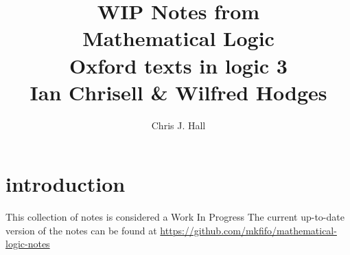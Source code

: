 \documentclass[a4paper, titlepage]{report}
\makeatletter
\renewcommand\subsection{\@startsection{subsection}{2}{\z@}
                                     {-3.25ex\@plus -1ex \@minus -.2ex}%
                                     {-1em}%
                                     {\normalfont\large\bfseries}}
\makeatother
\begin{document}
\newcommand{\RULE}[4]{
  {
  \iffalse
    TODO FIXME automate adding to rules sections
  \fi
  \bigskip
  \subsection{
    \texorpdfstring{
      \uppercase{#1 rule (#2 rule)}
    }{
      #1 rule (#2 rule)
    }
  }
  \hfill page #3 \\
  \indent
  #4
  }
}

\newcommand{\EXERCISE}[4]{
  {
  \iffalse
    TODO FIXME automate adding to exercises list?
  \fi
  \bigskip
  \subsection{
    \texorpdfstring{
      Exercise #1
    }{
      Exercise #1
    }
  }
  \hfill page #2 \\
  \indent
  #3 \\
  \indent
  #4
  }
}


\begin{titlepage}
\title {WIP Notes from \\ Mathematical Logic \\ Oxford texts in logic 3 \\ Ian Chrisell \& Wilfred Hodges}
\author {Chris J. Hall}
\maketitle
\end{titlepage}

\tableofcontents


\newpage
{}

\chapter{introduction}


This collection of notes is considered a Work In Progress
The current up-to-date version of the notes can be found at \url{https://github.com/mkfifo/mathematical-logic-notes}
\end{document}
